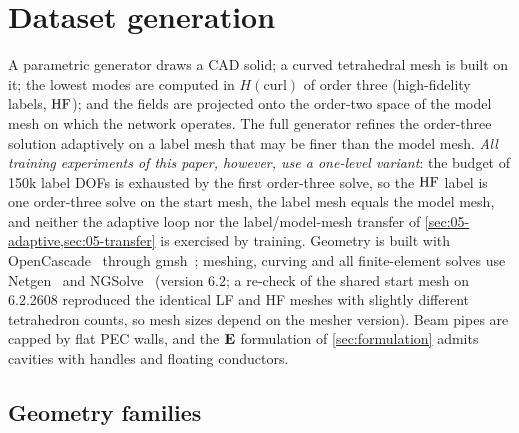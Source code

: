 \section{Dataset generation}\label{sec:data}

A parametric generator draws a CAD solid; a curved tetrahedral mesh is built on it; the lowest modes are computed in $H(\mathrm{curl})$ of order three (high-fidelity labels, $\mathrm{HF}$); and the fields are projected onto the order-two space of the model mesh on which the network operates.
The full generator refines the order-three solution adaptively on a label mesh that may be finer than the model mesh.
\emph{All training experiments of this paper, however, use a one-level variant}: the budget of 150k label DOFs is exhausted by the first order-three solve, so the $\mathrm{HF}$ label is one order-three solve on the start mesh, the label mesh equals the model mesh, and neither the adaptive loop nor the label/model-mesh transfer of \cref{sec:05-adaptive,sec:05-transfer} is exercised by training.
Geometry is built with OpenCascade~\cite{opencascade} through gmsh~\cite{geuzaine2009gmsh}; meshing, curving and all finite-element solves use Netgen~\cite{schoberl1997netgen} and NGSolve~\cite{schoberl2014cpp11} (version 6.2; a re-check of the shared start mesh on 6.2.2608 reproduced the identical LF and HF meshes with slightly different tetrahedron counts, so mesh sizes depend on the mesher version).
Beam pipes are capped by flat PEC walls, and the $\mathbf{E}$ formulation of \cref{sec:formulation} admits cavities with handles and floating conductors.

\subsection{Geometry families}\label{sec:05-geometry}

